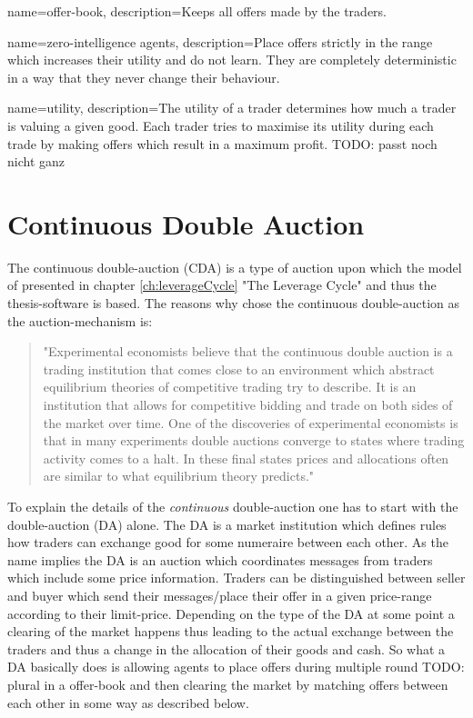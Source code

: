 \documentclass[../Bachelorarbeit.tex]{subfiles}
\begin{document}
 {
	name=offer-book,
	description={Keeps all offers made by the traders.}
}

 {
	name=zero-intelligence agents,
	description={Place offers strictly in the range which increases their utility and do not learn. They are completely deterministic in a way that they never change their behaviour.}
}

 {
	name=utility,
	description={The utility of a trader determines how much a trader is valuing a given good. Each trader tries to maximise its utility during each trade by making offers which result in a maximum profit. TODO: passt noch nicht ganz}
}

\section{Continuous Double Auction}	
The continuous double-auction (CDA) is a type of auction upon which the model of \cite{Breuer2015} presented in chapter \ref{ch:leverageCycle} "The Leverage Cycle" and thus the thesis-software is based. The reasons why \cite{Breuer2015} chose the continuous double-auction as the auction-mechanism is:

\begin{quote}
"Experimental economists believe that the continuous double auction is a trading institution that comes close to an environment which abstract equilibrium theories of competitive trading try to describe. It is an institution that allows for competitive bidding and trade on both sides of the market over time. One of the discoveries of experimental economists is that in many experiments double auctions converge to states where trading activity comes to a halt. In these final states prices and allocations often are similar to what equilibrium theory predicts."
\end{quote}

\medskip

To explain the details of the \textit{continuous} double-auction one has to start with the double-auction (DA) alone. The DA is a \gls{market institution} which defines rules how traders can exchange \gls{good} for some \gls{numeraire} between each other. As the name implies the DA is an \gls{auction} which coordinates messages from traders which include some price information. Traders can be distinguished between \gls{seller} and \gls{buyer} which send their messages/place their \gls{offer} in a given price-range according to their \gls{limit-price}. Depending on the type of the DA at some point a \gls{clearing} of the market happens thus leading to the actual exchange between the traders and thus a change in the allocation of their goods and cash. So what a DA basically does is allowing agents to place offers during multiple \gls{round} TODO: plural in a \gls{offer-book} and then clearing the market by matching offers between each other in some way as described below.
\end{document}
